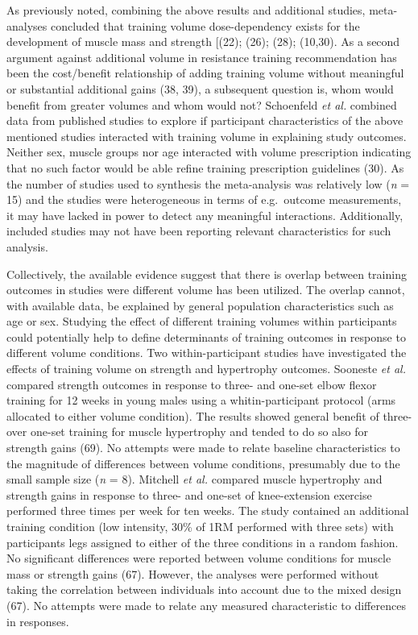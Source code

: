 \documentclass[twoside,10pt]{gihclass} %
\begin{document}
As previously noted, combining the above results and additional studies, meta-analyses concluded that training volume dose-dependency exists for the development of muscle mass and strength
{[}(22);
(26);
(28);
(10,30).
As a second argument against additional volume in resistance training recommendation has been the cost/benefit relationship of adding training volume without meaningful or substantial additional gains
(38, 39),
a subsequent question is, whom would benefit from greater volumes and whom would not?
Schoenfeld \emph{et al.} combined data from published studies to explore if participant characteristics of the above mentioned studies interacted with training volume in explaining study outcomes. Neither sex, muscle groups nor age interacted with volume prescription indicating that no such factor would be able refine training prescription guidelines
(30).
As the number of studies used to synthesis the meta-analysis was relatively low (\emph{n} = 15) and the studies were heterogeneous in terms of e.g.~outcome measurements, it may have lacked in power to detect any meaningful interactions. Additionally, included studies may not have been reporting relevant characteristics for such analysis.

Collectively, the available evidence suggest that there is overlap between training outcomes in studies were different volume has been utilized.
The overlap cannot, with available data, be explained by general population characteristics such as age or sex.
Studying the effect of different training volumes within participants could potentially help to define determinants of training outcomes in response to different volume conditions.
Two within-participant studies have investigated the effects of training volume on strength and hypertrophy outcomes.
Sooneste \emph{et al.} compared strength outcomes in response to three- and one-set elbow flexor training for 12 weeks in young males using a whitin-participant protocol (arms allocated to either volume condition).
The results showed general benefit of three- over one-set training for muscle hypertrophy and tended to do so also for strength gains (69).
No attempts were made to relate baseline characteristics to the magnitude of differences between volume conditions, presumably due to the small sample size (\emph{n} = 8).
Mitchell \emph{et al.} compared muscle hypertrophy and strength gains in response to three- and one-set of knee-extension exercise performed three times per week for ten weeks.
The study contained an additional training condition (low intensity, 30\% of 1RM performed with three sets) with participants legs assigned to either of the three conditions in a random fashion.
No significant differences were reported between volume conditions for muscle mass or strength gains (67).
However, the analyses were performed without taking the correlation between individuals into account due to the mixed design (67).
No attempts were made to relate any measured characteristic to differences in responses.
\end{document}
